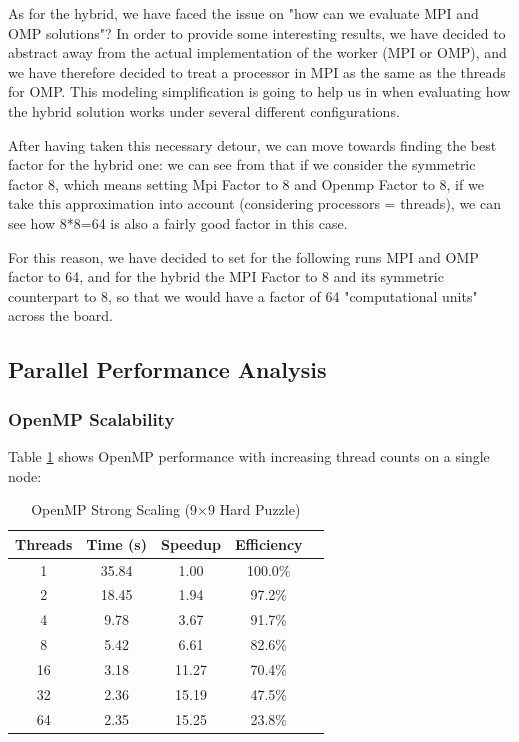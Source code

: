 As for the hybrid, we have faced the issue on "how can we evaluate MPI and OMP solutions"? In order to provide some interesting results, we have decided to abstract away from the actual implementation of the worker (MPI or OMP), and we have therefore decided to treat a processor in MPI as the same as the threads for OMP. This modeling simplification is going to help us in  when evaluating how the hybrid solution works under several different configurations.

After having taken this necessary detour, we can move towards finding the best factor for the hybrid one: we can see from  that if we consider the symmetric factor 8, which means setting Mpi Factor to 8 and Openmp Factor to 8, if we take this approximation into account (considering processors = threads), we can see how 8*8=64 is also a fairly good factor in this case.


For this reason, we have decided to set for the following runs MPI and OMP factor to 64, and for the hybrid the MPI Factor to 8 and its symmetric counterpart to 8, so that we would have a factor of 64 "computational units" across the board.


\subsection{Parallel Performance Analysis}

\subsubsection{OpenMP Scalability}
Table \ref{tab:openmp_scaling} shows OpenMP performance with increasing thread counts on a single node:

\begin{table}[htbp]
\caption{OpenMP Strong Scaling (9×9 Hard Puzzle)}
\begin{center}
\begin{tabular}{@{}ccccc@{}}
\toprule
\textbf{Threads} & \textbf{Time (s)} & \textbf{Speedup} & \textbf{Efficiency} \\
\midrule
1 & 35.84 & 1.00 & 100.0\% \\
2 & 18.45 & 1.94 & 97.2\% \\
4 & 9.78 & 3.67 & 91.7\% \\
8 & 5.42 & 6.61 & 82.6\% \\
16 & 3.18 & 11.27 & 70.4\% \\
32 & 2.36 & 15.19 & 47.5\% \\
64 & 2.35 & 15.25 & 23.8\% \\
\bottomrule
\end{tabular}
\end{center}
\label{tab:openmp_scaling}
\end{table}


